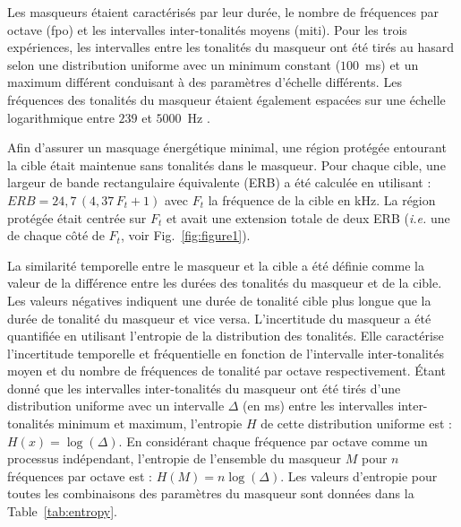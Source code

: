 Les masqueurs étaient caractérisés par leur durée, le nombre de fréquences par octave (fpo) et les intervalles inter-tonalités moyens (miti). 
Pour les trois expériences, les intervalles entre les tonalités du masqueur ont été tirés au hasard selon une distribution uniforme avec un minimum constant ($100$~ms) et un maximum différent conduisant à des paramètres d'échelle différents. 
Les fréquences des tonalités du masqueur étaient également espacées sur une échelle logarithmique entre $239$ et $5000$~Hz \citep{dykstra2016neural, gutschalk2008neural}.

Afin d'assurer un masquage énergétique minimal, une région protégée entourant la cible était maintenue sans tonalités dans le masqueur. 
Pour chaque cible, une largeur de bande rectangulaire équivalente (ERB) \citep{glasberg1990derivation, moore1995frequency} a été calculée en utilisant : $ERB = 24,7\, (4,37\,F_t + 1) $ avec $F_t$ la fréquence de la cible en kHz. 
La région protégée était centrée sur $F_t$ et avait une extension totale de deux ERB (\textit{i.e.} une de chaque côté de $F_t$, voir Fig.~\ref{fig:figure1}).

La similarité temporelle entre le masqueur et la cible a été définie comme la valeur de la différence entre les durées des tonalités du masqueur et de la cible. 
Les valeurs négatives indiquent une durée de tonalité cible plus longue que la durée de tonalité du masqueur et vice versa. 
L'incertitude du masqueur a été quantifiée en utilisant l'entropie de la distribution des tonalités. 
Elle caractérise l'incertitude temporelle et fréquentielle en fonction de l'intervalle inter-tonalités moyen et du nombre de fréquences de tonalité par octave respectivement. 
Étant donné que les intervalles inter-tonalités du masqueur ont été tirés d'une distribution uniforme avec un intervalle $\Delta$ (en ms) entre les intervalles inter-tonalités minimum et maximum, l'entropie $H$ de cette distribution uniforme est : $H(x) = \log(\Delta)$. 
En considérant chaque fréquence par octave comme un processus indépendant, l'entropie de l'ensemble du masqueur $M$ pour $n$ fréquences par octave est : $H(M) = n \log(\Delta)$. 
Les valeurs d'entropie pour toutes les combinaisons des paramètres du masqueur sont données dans la Table~\ref{tab:entropy}.

